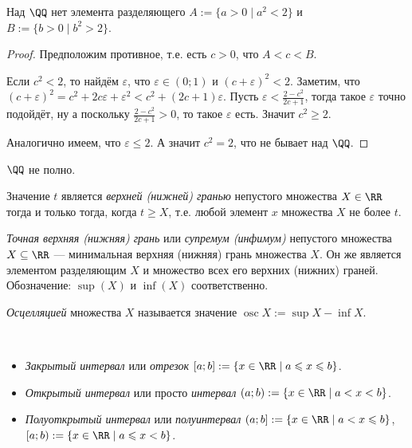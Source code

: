\documentclass[12pt,a4paper]{article}
\DeclareMathOperator*{\osc}{osc}
\begin{document}
    \begin{statement*}
        Над $\QQ$ нет  элемента разделяющего $A := \{a > 0 \mid a^2 < 2\}$ и $B := \{b > 0 \mid b^2 > 2\}$.
    \end{statement*}

    \begin{proof}
        Предположим противное, т.е. есть $c > 0$, что $A < c < B$.

        Если $c^2 < 2$, то найдём $\varepsilon$, что $\varepsilon \in (0; 1)$ и $(c + \varepsilon)^2 < 2$. Заметим, что $(c + \varepsilon)^2 = c^2 + 2c\varepsilon + \varepsilon^2 < c^2 + (2c + 1)\varepsilon$. Пусть $\varepsilon < \frac{2 - c^2}{2c+ 1}$, тогда такое $\varepsilon$ точно подойдёт, ну а поскольку $\frac{2 - c^2}{2c + 1} > 0$, то такое $\varepsilon$ есть. Значит $c^2 \geqslant 2$.
        
        Аналогично имеем, что $\varepsilon \leqslant 2$. А значит $c^2 = 2$, что не бывает над $\QQ$.
    \end{proof}

    \begin{corollary*}
        $\QQ$ не полно.
    \end{corollary*}
    
    \begin{definition}
        Значение $t$ является \emph{верхней (нижней) гранью} непустого множества $X \in \RR$ тогда и только тогда, когда $t \geqslant X$, т.е. любой элемент $x$ множества $X$ не более $t$.
        
        
        \emph{Точная верхняя (нижняя) грань} или \emph{супремум (инфимум)} непустого множества $X \subseteq \RR$ --- минимальная верхняя (нижняя) грань множества $X$. Он же является элементом разделяющим $X$ и множество всех его верхних (нижних) граней. Обозначение: $\sup(X)$ и $\inf(X)$ соответственно.

        \emph{Осцелляцией} множества $X$ называется значение $\osc X := \sup X - \inf X$.
    \end{definition}

    \begin{definition}\ 
        \begin{itemize}
            \item \emph{Закрытый интервал} или \emph{отрезок} $[a;b]:=\{x\in\RR \mid a \leqslant x \leqslant b\}$.
            \item \emph{Открытый интервал} или просто \emph{интервал} $(a;b):=\{x\in\RR \mid a < x < b\}$.
            \item \emph{Полуоткрытый интервал} или \emph{полуинтервал} $(a;b] := \{x\in\RR \mid a < x \leqslant b\}$, $[a;b):=\{x\in\RR \mid a \leqslant x < b\}$.
        \end{itemize}
    \end{definition}
\end{document}
